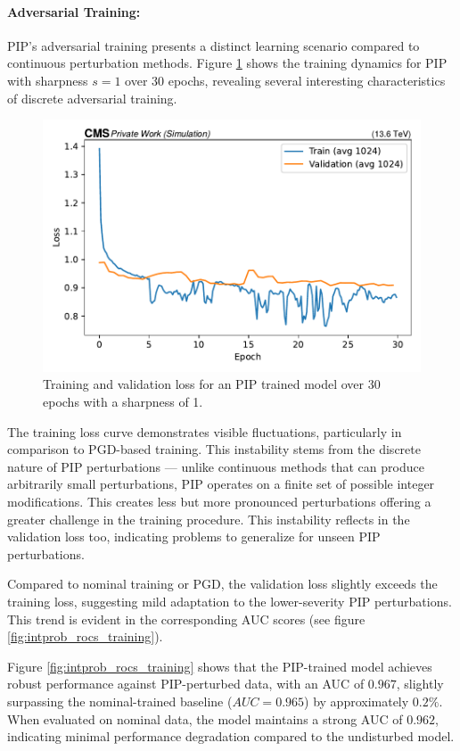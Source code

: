 \paragraph{Adversarial Training:} PIP's adversarial training presents a distinct learning scenario compared to continuous perturbation methods. 
Figure \ref{fig:intprob_training} shows the training dynamics for PIP with sharpness $s=1$ over 30 epochs, revealing several interesting characteristics of discrete adversarial training.

\begin{figure}[h]
\centering
    \includegraphics[width=12cm]{media/output/IntProb s=1_loss_validation.pdf}
    \caption{Training and validation loss for an PIP trained model over 30 epochs with a sharpness of 1.}
    \label{fig:intprob_training}
\end{figure}

The training loss curve demonstrates visible fluctuations, particularly in comparison to PGD-based training. This instability stems from the discrete nature of PIP perturbations — unlike continuous methods that can produce arbitrarily small perturbations, PIP operates on a finite set of possible integer modifications. This creates less but more pronounced perturbations offering a greater challenge in the training procedure. This instability reflects in the validation loss too, indicating problems to generalize for unseen PIP perturbations. 

Compared to nominal training or PGD, the validation loss slightly exceeds the training loss, suggesting mild adaptation to the lower-severity PIP perturbations. This trend is evident in the corresponding AUC scores (see figure \ref{fig:intprob_rocs_training}).

Figure \ref{fig:intprob_rocs_training} shows that the PIP-trained model achieves robust performance against PIP-perturbed data, with an AUC of $0.967$, slightly surpassing the nominal-trained baseline ($AUC = 0.965$) by approximately $0.2\%$. When evaluated on nominal data, the model maintains a strong AUC of $0.962$, indicating minimal performance degradation compared to the undisturbed model.

